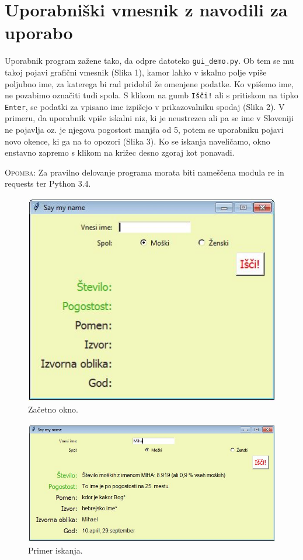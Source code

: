 \documentclass[a4paper, 12pt]{article}
\begin{document}
\section{Uporabniški vmesnik z navodili za uporabo}

Uporabnik program zažene tako, da odpre datoteko \texttt{gui\_demo.py}. Ob tem se mu takoj pojavi grafični vmesnik (Slika 1), kamor lahko v iskalno polje vpiše poljubno ime, za katerega bi rad pridobil že omenjene podatke. Ko vpišemo ime, ne pozabimo označiti tudi spola. S klikom na gumb \texttt{Išči!} ali s pritiskom na tipko \texttt{Enter}, se podatki za vpisano ime izpišejo v prikazovalniku spodaj (Slika 2). V primeru, da uporabnik vpiše iskalni niz, ki je neustrezen ali pa se ime v Sloveniji ne pojavlja oz. je njegova pogostost manjša od 5, potem se uporabniku pojavi novo okence, ki ga na to opozori (Slika 3). Ko se iskanja naveličamo, okno enstavno zapremo s klikom na križec desno zgoraj kot ponavadi.

\textsc{Opomba:} Za pravilno delovanje programa morata biti nameščena modula re in requests ter Python 3.4.

\begin{figure}[h]
\centering
\includegraphics[scale=0.8] {zacetek.jpg}
\caption{Začetno okno.}
\end{figure}

\begin{figure}[h]
\centering
\includegraphics[scale=0.6] {primer.jpg}
\caption{Primer iskanja.}
\end{figure}
\end{document}
